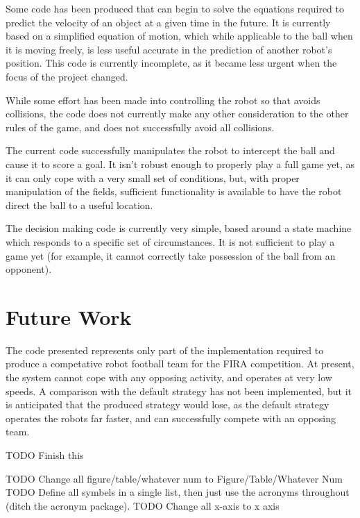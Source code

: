\documentclass[10pt]{article}
\begin{document}
Some code has been produced that can begin to solve the equations required to
predict the velocity of an object at a given time in the future.  It is
currently based on a simplified equation of motion, which while applicable to
the ball when it is moving freely, is less useful accurate in the prediction of
another robot's position.  This code is currently incomplete, as it became less
urgent when the focus of the project changed.

While some effort has been made into controlling the robot so that avoids
collisions, the code does not currently make any other consideration to the
other rules of the game, and does not successfully avoid all collisions.

The current code successfully manipulates the robot to intercept the ball and
cause it to score a goal.  It isn't robust enough to properly play a full game
yet, as it can only cope with a very small set of conditions, but, with proper
manipulation of the fields, sufficient functionality is available to have the
robot direct the ball to a useful location.

The decision making code is currently very simple, based around a state machine
which responds to a specific set of circumstances.  It is not sufficient to play
a game yet (for example, it cannot correctly take possession of the ball from
an opponent).

\section{Future Work}

The code presented represents only part of the implementation required to
produce a competative robot football team for the \ac{FIRA} competition.  At
present, the system cannot cope with any opposing activity, and operates at very
low speeds.  A comparison with the default strategy has not been implemented,
but it is anticipated that the produced strategy would lose, as the default
strategy operates the robots far faster, and can successfully compete with an
opposing team.

TODO Finish this

TODO Change all figure/table/whatever num to Figure/Table/Whatever Num
TODO Define all symbels in a single list, then just use the acronyms throughout
(ditch the acronym package).
TODO Change all x-axis to x axis

\cleardoublepage{}

\end{document}
